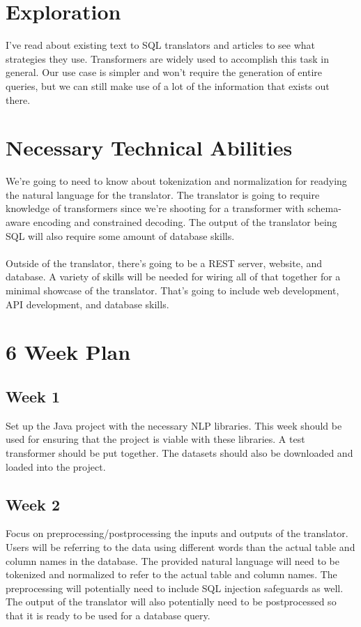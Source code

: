 \documentclass{article}
\begin{document}
\section*{Exploration}

I've read about existing text to SQL translators and articles to see what strategies they use.
Transformers are widely used to accomplish this task in general.
Our use case is simpler and won't require the generation of entire queries, but we can
still make use of a lot of the information that exists out there.

\section*{Necessary Technical Abilities}

We're going to need to know about tokenization and normalization for readying the natural language for the translator.
The translator is going to require knowledge of transformers since we're shooting for a transformer with schema-aware encoding and constrained decoding.
The output of the translator being SQL will also require some amount of database skills. \\ \\
Outside of the translator, there's going to be a REST server, website, and database. A variety of skills will be needed for
wiring all of that together for a minimal showcase of the translator. That's going to include web development, API development,
and database skills.

\section*{6 Week Plan}

\subsection*{Week 1}

Set up the Java project with the necessary NLP libraries. This week should be used for ensuring that the project is viable with these
libraries. A test transformer should be put together. The datasets should also be downloaded and loaded into the project.

\subsection*{Week 2}

Focus on preprocessing/postprocessing the inputs and outputs of the translator. Users will be referring to the data using
different words than the actual table and column names in the database.
The provided natural language will need to be tokenized and normalized to refer to the actual table and column names.
The preprocessing will potentially need to include SQL injection safeguards as well.
The output of the translator will also potentially need to be postprocessed so that
it is ready to be used for a database query.
\end{document}
